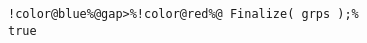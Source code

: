 \begin{Verbatim}[commandchars=!@\%,frame=single]
!color@blue%@gap>%!color@red%@ Finalize( grps );%
true 
\end{Verbatim}

